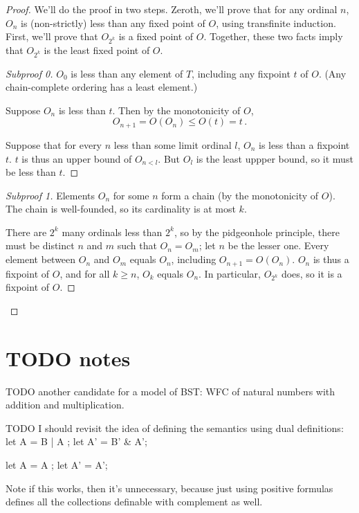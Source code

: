 \documentclass[oneside,12pt]{book}
\theoremstyle{definition}
\theoremstyle{remark}
\newenvironment{subproof}[1][\proofname]{%
  \renewcommand{\qedsymbol}{$\blacksquare$}%
  \begin{proof}[#1]%
}{%
  \end{proof}%
}
\begin{document}
\begin{proof}
  We'll do the proof in two steps. Zeroth, we'll prove that for any ordinal $n$,
  $O_n$ is (non-strictly) less than any fixed point of $O$, using transfinite
  induction. First, we'll prove that $O_{2^k}$ is a fixed point of $O$. Together,
  these two facts imply that $O_{2^k}$ is the least fixed point of $O$.
  
  \begin{subproof}[Subproof 0]
    $O_0$ is less than any element of $T$, including any fixpoint $t$ of $O$. (Any
    chain-complete ordering has a least element.)
    
    Suppose $O_n$ is less than $t$. Then by the monotonicity of $O$,
    \[O_{n+1} = O(O_n) \leq O(t) = t\,.\]
    
    Suppose that for every $n$ less than some limit ordinal $l$, $O_n$ is less than
    a fixpoint $t$. $t$ is thus an upper bound of $O_{n<l}$. But $O_l$ is the least
    uppper bound, so it must be less than $t$.
  \end{subproof}
  
  \begin{subproof}[Subproof 1]
    Elements $O_n$ for some $n$ form a chain (by the monotonicity of $O$).
    The chain is well-founded, so its cardinality is at most $k$.
    
    There are $2^k$ many ordinals less than $2^k$, so by the pidgeonhole
    principle, there must be distinct $n$ and $m$ such that $O_n = O_m$; let $n$
    be the lesser one. Every element between $O_n$ and $O_m$ equals $O_n$,
    including $O_{n+1} = O(O_n)$. $O_n$ is thus a fixpoint of $O$, and for all
    $k \geq n$, $O_k$ equals $O_n$. In particular, $O_{2^k}$ does, so
    it is a fixpoint of $O$.
  \end{subproof}
\end{proof}


\chapter{TODO notes}

TODO another candidate for a model of BST: WFC of natural numbers with addition
and multiplication.

TODO I should revisit the idea of defining the semantics using
dual definitions:
let A  = B  | A ;
let A' = B' \& A';

let A  = A ;
let A' = A';

Note if this works, then it's unnecessary, because just using
positive formulas defines all the collections definable with complement
as well.
\end{document}
